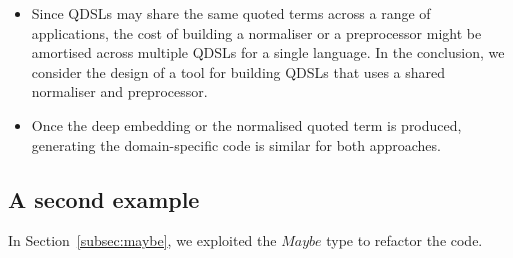 \documentclass[authoryear,9pt]{sigplanconf}
\newcommand{\Conid}[1]{\mathit{#1}}
\newcommand{\todo}[2]{}
\begin{document}
\begin{itemize}
\item Since QDSLs may share the same quoted terms across a range of
applications, the cost of building a normaliser or a preprocessor
might be amortised across multiple QDSLs for a single language.  In
the conclusion, we consider the design of a tool for building QDSLs
that uses a shared normaliser and preprocessor.


\item Once the deep embedding or the normalised quoted term is
produced, generating the domain-specific code is similar for both
approaches.

\end{itemize}

\todo{Sam}{Write a paragraph on reuse between Host and Quoted languages.}

\subsection{A second example}
\label{subsec:e-maybe}

In Section~\ref{subsec:maybe}, we exploited the \ensuremath{\Conid{Maybe}} type to refactor the code.
\end{document}
